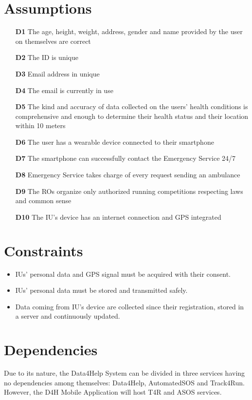 \section{Assumptions}
\begin{itemize}
\item	[\textbf{D1}] The age, height, weight, address, gender and name provided by the user on themselves are correct
\item	[\textbf{D2}] The ID is unique
\item	[\textbf{D3}] Email address in unique
\item	[\textbf{D4}] The email is currently in use
\item	[\textbf{D5}] The kind and accuracy of data collected on the users’ health conditions is comprehensive and enough to determine their health status and their location within 10 meters
\item	[\textbf{D6}] The user has a wearable device connected to their smartphone
\item	[\textbf{D7}] The smartphone can successfully contact the Emergency Service 24/7
\item	[\textbf{D8}] Emergency Service takes charge of every request sending an ambulance
\item	[\textbf{D9}] The ROs organize only authorized running competitions respecting laws and common sense
\item [\textbf{D10}] The IU's device has an internet connection and GPS integrated
\end{itemize}

\section{Constraints}
\begin{itemize}
\item IUs' personal data and GPS signal must be acquired with their consent.
\item IUs' personal data must be stored and transmitted safely. 
\item Data coming from IU’s device are collected since their registration, stored in a server and continuously updated.
\end{itemize}
\section{Dependencies}
Due to its nature, the Data4Help System can be divided in three services having no dependencies among themselves: Data4Help, AutomatedSOS and Track4Run. However, the D4H Mobile Application will host T4R and ASOS services.
